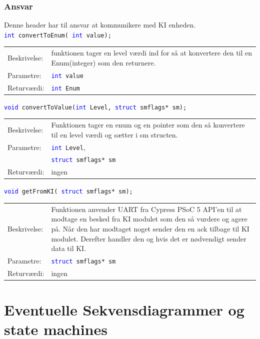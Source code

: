 \subsubsection{Ansvar}
Denne header har til ansvar at kommunikere med KI enheden.\\
\texttt{\textcolor{blue}{int} convertToEnum( \textcolor{blue}{int} value);} 
\begin{table}[H]
\begin{tabular}{l p{12.5cm}}
\hline
Beskrivelse:& funktionen tager en level værdi ind for så at konvertere den til en Enum(integer) som den returnere.\\
Parametre:&\texttt{\textcolor{blue}{int} value}\\
Returværdi:&\texttt{\textcolor{blue}{int} Enum}\\
\end{tabular}
\end{table}
\texttt{\textcolor{blue}{void} convertToValue(\textcolor{blue}{int} Level,   \textcolor{blue}{struct} smflags* sm);} 
\begin{table}[H]
\begin{tabular}{l p{12.5cm}}
\hline
Beskrivelse:& Funktionen tager en enum og en pointer som den så konvertere til en level værdi og sætter i sm structen.\\
Parametre:&\texttt{\textcolor{blue}{int} Level},\\
 &\texttt{\textcolor{blue}{struct} smflags* sm}\\
Returværdi:&ingen\\
\end{tabular}
\end{table}
\texttt{\textcolor{blue}{void} getFromKI( \textcolor{blue}{struct} smflags* sm);} 
\begin{table}[H]
\begin{tabular}{l p{12.5cm}}
\hline
Beskrivelse:& Funktionen anvender UART fra Cypress PSoC 5 API'en til at modtage en besked fra KI modulet som den så vurdere og agere på. Når den har modtaget noget sender den en ack tilbage til KI modulet. Derefter handler den og hvis det er nødvendigt sender data til KI. \\
Parametre:&\texttt{\textcolor{blue}{struct} smflags* sm}\\
Returværdi:&ingen\\
\end{tabular}
\end{table}
\section{Eventuelle Sekvensdiagrammer og state machines}
